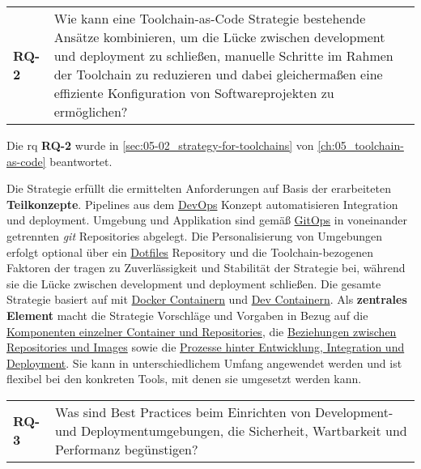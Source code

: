 \vspace{1em}
\begin{table}[H]
    \centering
    \begin{tabular}{p{} p{}}
        \textbf{RQ-2} & Wie kann eine Toolchain-as-Code Strategie bestehende Ansätze kombinieren, um die Lücke zwischen \Gls{development} und \Gls{deployment} zu schließen, manuelle Schritte im Rahmen der Toolchain zu reduzieren und dabei gleichermaßen eine effiziente Konfiguration von Softwareprojekten zu ermöglichen?
    \end{tabular}
\end{table}

Die \acrlong{rq} \textbf{RQ-2} wurde in \autoref{sec:05-02_strategy-for-toolchains} von \autoref{ch:05_toolchain-as-code} beantwortet.

Die  Strategie erfüllt die ermittelten Anforderungen auf Basis der erarbeiteten \textbf{Teilkonzepte}. Pipelines aus dem \hyperref[sec:03-01_devops]{DevOps} Konzept automatisieren Integration und \Gls{deployment}. Umgebung und Applikation sind gemäß \hyperref[sec:03-03_gitops]{GitOps} in voneinander getrennten \textit{\Gls{git}} Repositories abgelegt. Die Personalisierung von Umgebungen erfolgt optional über ein \hyperref[sec:03-04_dotfiles]{Dotfiles} Repository und die Toolchain-bezogenen Faktoren der  tragen zu Zuverlässigkeit und Stabilität der Strategie bei, während sie die Lücke zwischen \Gls{development} und \Gls{deployment} schließen. Die gesamte Strategie basiert auf \textbf{} mit \hyperref[subsec:05-01-01_docker-container]{Docker Containern} und \hyperref[subsec:05-01-02_dev-container]{Dev Containern}. Als \textbf{zentrales Element} macht die Strategie Vorschläge und Vorgaben in Bezug auf die \hyperref[subsubsec:05-02-02-02_sub-components-in-environments]{Komponenten einzelner Container und Repositories}, die \hyperref[subsubsec:05-02-02-01_data-storage-in-repositories]{Beziehungen zwischen Repositories und Images} sowie die \hyperref[subsec:05-02-03_workflows-and-continuity-in-the-toolchain-as-code-approach]{Prozesse hinter Entwicklung, Integration und Deployment}. Sie kann in unterschiedlichem Umfang angewendet werden und ist flexibel bei den konkreten Tools, mit denen sie umgesetzt werden kann.

\vspace{1em}
\begin{table}[H]
    \centering
    \begin{tabular}{p{} p{}}
        \textbf{RQ-3} & Was sind Best Practices beim Einrichten von Development- und Deploymentumgebungen, die Sicherheit, Wartbarkeit und Performanz begünstigen? \\
    \end{tabular}
\end{table}

